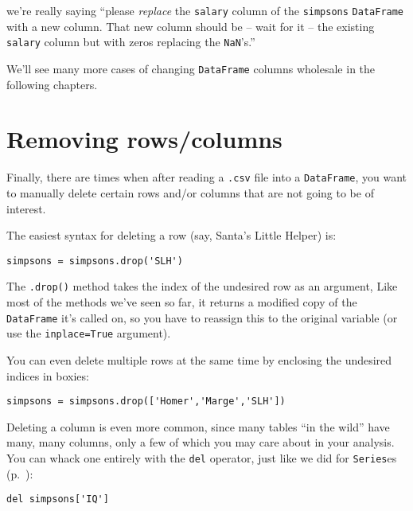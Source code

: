 we're really saying ``please \textit{replace} the \texttt{salary} column of the
\texttt{simpsons} \texttt{DataFrame} with a new column. That new column should
be -- wait for it -- the existing \texttt{salary} column but with zeros
replacing the \texttt{NaN}'s.''

We'll see many more cases of changing \texttt{DataFrame} columns wholesale in
the following chapters.

\section{Removing rows/columns}

Finally, there are times when after reading a \texttt{.csv} file into a
\texttt{DataFrame}, you want to manually delete certain rows and/or columns
that are not going to be of interest.


\begin{samepage}

The easiest syntax for deleting a row (say, Santa's Little Helper) is:

\begin{Verbatim}[fontsize=\small,samepage=true,frame=single,framesep=3mm]
simpsons = simpsons.drop('SLH')
\end{Verbatim}
\end{samepage}

The \texttt{.drop()} method takes the index of the undesired row as an
argument, Like most of the methods we've seen so far, it returns a modified
copy of the \texttt{DataFrame} it's called on, so you have to reassign this to
the original variable (or use the \texttt{inplace=True} argument).


\begin{samepage}
You can even delete multiple rows at the same time by enclosing the undesired
indices in boxies:

\begin{Verbatim}[fontsize=\small,samepage=true,frame=single,framesep=3mm]
simpsons = simpsons.drop(['Homer','Marge','SLH'])
\end{Verbatim}
\end{samepage}

\begin{samepage}

Deleting a column is even more common, since many tables ``in the wild'' have
many, many columns, only a few of which you may care about in your analysis.
You can whack one entirely with the \texttt{del} operator, just like we did for
\texttt{Series}es (p.~\pageref{delOp}):

\begin{Verbatim}[fontsize=\small,samepage=true,frame=single,framesep=3mm]
del simpsons['IQ']
\end{Verbatim}
\end{samepage}
